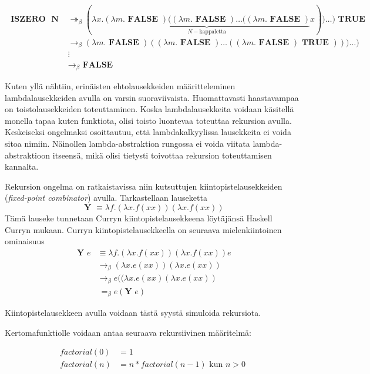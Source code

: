 \begin{align*}
\textbf{ ISZERO } \textbf{ N } &\twoheadrightarrow_{\beta} (\lambda x . \underbrace{ (\lambda m . \textbf{ FALSE }) ( (\lambda m . \textbf{ FALSE }) \ldots ((\lambda m . \textbf{ FALSE }) }_{ N-\text{kappaletta}} x)) \ldots ) \textbf{ TRUE } \\
&\rightarrow_{\beta}  (\lambda m . \textbf{ FALSE }) ( (\lambda m . \textbf{ FALSE }) \ldots ((\lambda m . \textbf{ FALSE }) \textbf{ TRUE }) )) \ldots ) \\
&\vdots \\
&\rightarrow_{\beta} \textbf{ FALSE }
\end{align*}
\par
Kuten yllä nähtiin, erinäisten ehtolausekkeiden määritteleminen lambdalausekkeiden avulla on varsin suoraviivaista. Huomattavasti haastavampaa on toistolausekkeiden toteuttaminen. Koska lambdalausekkeita voidaan käsitellä monella tapaa kuten funktiota, olisi toisto luontevaa toteuttaa rekursion avulla. Keskeiseksi ongelmaksi osoittautuu, että lambdakalkyylissa lausekkeita ei voida sitoa nimiin. Näinollen lambda-abstraktion rungossa ei voida viitata lambda-abstraktioon itseensä, mikä olisi tietysti toivottaa rekursion toteuttamisen kannalta. 
\par 
Rekursion ongelma on ratkaistavissa niin kutsuttujen kiintopistelausekkeiden (\textit{fixed-point combinator}) avulla. Tarkastellaan lauseketta 
\[ \textbf{ Y } \equiv \lambda f . (\lambda x . f(xx)) (\lambda x . f(xx)) \]
Tämä lauseke tunnetaan Curryn kiintopistelausekkeena löytäjänsä Haskell Curryn mukaan. Curryn kiintopistelausekkeella on seuraava mielenkiintoinen ominaisuus
\begin{align*}
\textbf{ Y } e &\equiv \lambda f . (\lambda x . f(xx)) (\lambda x . f(xx)) e \\
&\rightarrow_{\beta} (\lambda x . e(xx)) (\lambda x . e(xx)) \\
&\rightarrow_{\beta} e((\lambda x . e(xx)(\lambda x . e(xx)) \\
&\ =_{\beta} e(\textbf{Y }e) 
\end{align*}

Kiintopistelausekkeen avulla voidaan tästä syystä simuloida rekursiota.

Kertomafunktiolle voidaan antaa seuraava rekursiivinen määritelmä:

\begin{align*}
factorial(0) &= 1 \\ 
factorial(n) &= n * factorial(n-1) \text{ kun } n > 0
\end{align*}

